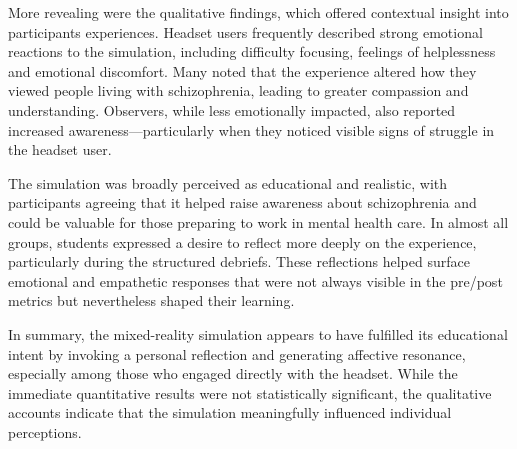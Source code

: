 \vspace{1em}

More revealing were the qualitative findings, which offered contextual insight into participants experiences. Headset users frequently described strong emotional reactions to the simulation, including difficulty focusing, feelings of helplessness and emotional discomfort. Many noted that the experience altered how they viewed people living with schizophrenia, leading to greater compassion and understanding. Observers, while less emotionally impacted, also reported increased awareness—particularly when they noticed visible signs of struggle in the headset user.

The simulation was broadly perceived as educational and realistic, with participants agreeing that it helped raise awareness about schizophrenia and could be valuable for those preparing to work in mental health care. In almost all groups, students expressed a desire to reflect more deeply on the experience, particularly during the structured debriefs. These reflections helped surface emotional and empathetic responses that were not always visible in the pre/post metrics but nevertheless shaped their learning.

\vspace{1em}

In summary, the mixed-reality simulation appears to have fulfilled its educational intent by invoking a  personal reflection and generating affective resonance, especially among those who engaged directly with the headset. While the immediate quantitative results were not statistically significant, the qualitative accounts indicate that the simulation meaningfully influenced individual perceptions.